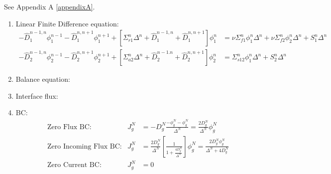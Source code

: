 \documentclass{school-22.211-notes}
\begin{document}
\begin{enumerate}
\begin{enumerate}
\end{enumerate} %
\end{enumerate} %


\clearpage
{} 
 See Appendix A \ref{appendixA}.
\begin{enumerate}
\item Linear Finite Difference equation: 
  \begin{align*}
    - \hat{D}_1^{n-1,n} \phi_1^{n-1} - \hat{D}_1^{n,n+1} \phi_1^{n+1} + [ \Sigma_{r1}^n \Delta^n + \hat{D}_1^{n-1, n} + \hat{D}_1^{n,n+1} ] \phi_1^n 
    &= \nu \Sigma_{f1}^n \phi_1^n \Delta^n + \nu \Sigma_{f2}^n \phi_2^n \Delta^n + S_1^n \Delta^n \\
    - \hat{D}_2^{n-1,n} \phi_2^{n-1} - \hat{D}_2^{n,n+1} \phi_2^{n+1} + [\Sigma_{a2}^n \Delta^n + \hat{D}_2^{n-1.n} + \hat{D}_2^{n,n+1} ] \phi_2^n 
    &= \Sigma_{s12}^n \phi_1^n \Delta^n + S_2^n \Delta^n 
  \end{align*}

\item Balance equation: 

\item Interface flux: 
\item BC: 
  \begin{align}
    &\mbox{Zero Flux BC:} & J_g^N &= -D_g^N \frac{ -\phi_g^N - \phi_g^N}{\Delta^N}  = \frac{2 D_g^N}{\Delta^N} \phi_g^N \\
    &\mbox{Zero Incoming Flux BC:} & J_g^N &= \frac{2D_g^N}{\Delta^N} \left[ \frac{1}{1 + \frac{4 D_g^N}{\Delta^N}} \right] \phi_g^N = \frac{2D_g^N \phi_g^N}{\Delta^N + 4 D_g^N}  \\
    &\mbox{Zero Current BC:} & J_g^N &= 0 
  \end{align}



\end{enumerate}
\end{document}
